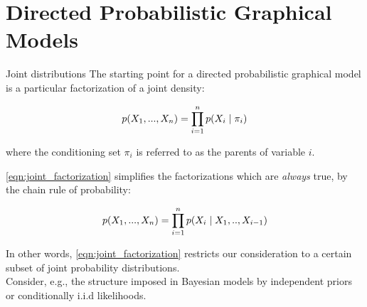\documentclass[10pt]{beamer}
\newcommand{\x}{X}
\begin{document}
\section{Directed Probabilistic  Graphical Models }
\begin{frame}{Joint distributions}
The starting point for a directed probabilistic graphical model is a particular factorization of a joint density:

\begin{equation}
\label{eqn:joint_factorization}
 p(\x_1, ..., \x_n) = \ds\prod_{i=1}^n p(\x_i \cond \pi_i ) 
\end{equation}

where the conditioning set $\pi_i$ is referred to as the \alert{parents} of  variable $i$.

\eqref{eqn:joint_factorization} simplifies the factorizations which are \textit{always} true, by the chain rule of probability:

\[ p(\x_1, ..., \x_n) = \ds\prod_{i=1}^n p(\x_i \cond \x_1, .., \x_{i-1} ) \]

\pause
\vfill \vfill
\tiny In other words, \eqref{eqn:joint_factorization} restricts our consideration to a certain subset of joint probability distributions.  \\

\pause
\tiny Consider, e.g., the structure imposed in Bayesian models by independent priors or conditionally i.i.d likelihoods.  \normalsize

\end{frame}

\end{document}
